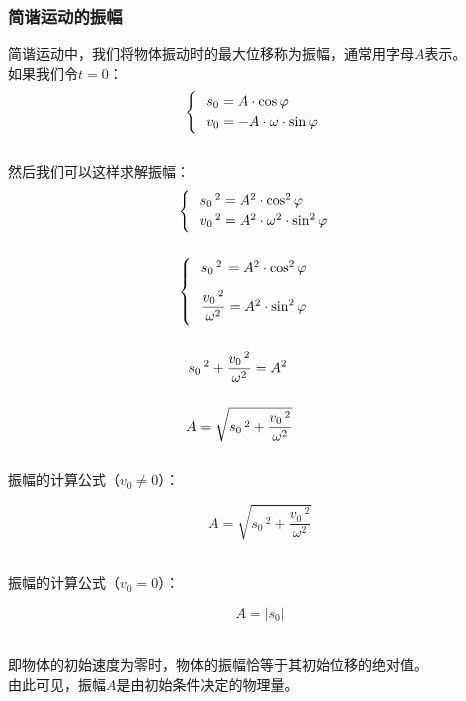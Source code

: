\documentclass[UTF8]{ctexart}
\begin{document}
\subsubsection{简谐运动的振幅}
    简谐运动中，我们将物体振动时的最大位移称为振幅，通常用字母$A$表示。\\[3mm]
    如果我们令$t=0$：
    \setcounter{equation}{0}
    \begin{align}
        \begin{cases}
            ~~s_0=A\cdot\cos{\varphi}\\
            ~~v_0=-A\cdot\omega\cdot\sin{\varphi}\vspace{1pt}
        \end{cases}
    \end{align}\\
    然后我们可以这样求解振幅：\vspace{5pt}
    \begin{align}
        &\begin{cases}
            ~~s_0\,^2=A^2\cdot\cos^2{\varphi}\\
            ~~v_0\,^2=A^2\cdot\omega^2\cdot\sin^2{\varphi}\vspace{1pt}
        \end{cases}\\[5mm]
        &\begin{cases}
            ~~s_0\,^2\,=A^2\cdot\cos^2{\varphi}\\[3mm]
            ~~\dfrac{v_0\,^2}{\omega^2}=A^2\cdot\sin^2{\varphi}\vspace{4pt}
        \end{cases}\\[5mm]
        &~~\,s_0\,^2+\frac{v_0\,^2}{\omega^2}=A^2\\[5mm]
        &~~A=\sqrt{s_0\,^2+\frac{v_0\,^2}{\omega^2}}
    \end{align}\\
    振幅的计算公式（$v_0\neq 0$）：
    \begin{large}
        \begin{equation*}
            A=\sqrt{s_0\,^2+\frac{v_0\,^2}{\omega^2}}
        \end{equation*}
    \end{large}\\
    振幅的计算公式（$v_0=0$）：
    \begin{large}
        \begin{equation*}
            A=|s_0|
        \end{equation*}
    \end{large}\\
    即物体的初始速度为零时，物体的振幅恰等于其初始位移的绝对值。\\[3mm]
    由此可见，振幅$A$是由初始条件决定的物理量。\\[3mm]
\end{document}
